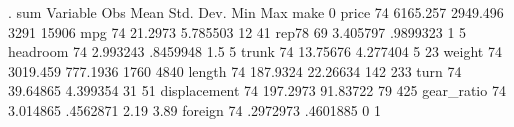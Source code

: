 . sum
{\smallskip}
    Variable {\VBAR}        Obs        Mean    Std. Dev.       Min        Max
        make {\VBAR}          0
       price {\VBAR}         74    6165.257    2949.496       3291      15906
         mpg {\VBAR}         74     21.2973    5.785503         12         41
       rep78 {\VBAR}         69    3.405797    .9899323          1          5
    headroom {\VBAR}         74    2.993243    .8459948        1.5          5
       trunk {\VBAR}         74    13.75676    4.277404          5         23
      weight {\VBAR}         74    3019.459    777.1936       1760       4840
      length {\VBAR}         74    187.9324    22.26634        142        233
        turn {\VBAR}         74    39.64865    4.399354         31         51
displacement {\VBAR}         74    197.2973    91.83722         79        425
  gear_ratio {\VBAR}         74    3.014865    .4562871       2.19       3.89
     foreign {\VBAR}         74    .2972973    .4601885          0          1
{\smallskip}
